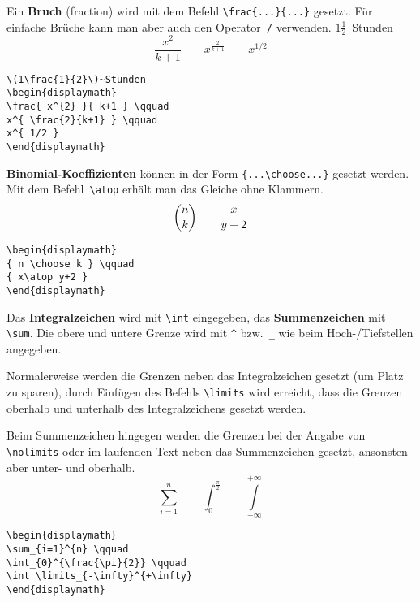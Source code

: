 Ein \textbf{Bruch} (fraction) wird mit dem Befehl
\verb|\frac{...}{...}| gesetzt.  Für einfache Brüche kann man
aber auch den Operator~\verb|/| verwenden.
\exa
\(1\frac{1}{2}\)~Stunden
\begin{displaymath}
\frac{ x^{2} }{ k+1 } \qquad
x^{ \frac{2}{k+1} } \qquad
x^{ 1/2 }
\end{displaymath}
\exb
\begin{verbatim}
\(1\frac{1}{2}\)~Stunden
\begin{displaymath}
\frac{ x^{2} }{ k+1 } \qquad
x^{ \frac{2}{k+1} } \qquad
x^{ 1/2 }
\end{displaymath}
\end{verbatim}
\exc

\textbf{Binomial-Koeffizienten} können in der Form
\verb|{...\choose...}| gesetzt werden.
Mit dem Befehl~\verb|\atop| erhält man das Gleiche ohne
Klammern.
\exa
\begin{displaymath}
{ n \choose k } \qquad
{ x\atop y+2 }
\end{displaymath}
\exb
\begin{verbatim}
\begin{displaymath}
{ n \choose k } \qquad
{ x\atop y+2 }
\end{displaymath}
\end{verbatim}
\exc

\medskip

Das \textbf{Integralzeichen} wird mit \verb|\int| eingegeben, das
\textbf{Summenzeichen} mit \verb|\sum|.
Die obere und untere Grenze wird mit \verb|^| bzw.~\verb|_| wie
beim \mbox{Hoch-}\slash Tiefstellen angegeben.
 
Normalerweise werden die Grenzen neben das Integralzeichen
gesetzt (um Platz zu sparen), durch Einfügen des Befehls
\verb|\limits| wird erreicht, dass die Grenzen oberhalb und
unterhalb des Integralzeichens gesetzt werden.
 
Beim Summenzeichen hingegen werden die Grenzen bei der Angabe von
\verb|\nolimits| oder im laufenden Text neben das Summenzeichen
gesetzt, ansonsten aber unter- und oberhalb.
\exa
\begin{displaymath}
\sum_{i=1}^{n} \qquad
\int_{0}^{\frac{\pi}{2}} \qquad
\int \limits_{-\infty}^{+\infty}
\end{displaymath}
\exb
\begin{verbatim}
\begin{displaymath}
\sum_{i=1}^{n} \qquad
\int_{0}^{\frac{\pi}{2}} \qquad
\int \limits_{-\infty}^{+\infty}
\end{displaymath}
\end{verbatim}
\exc
 
